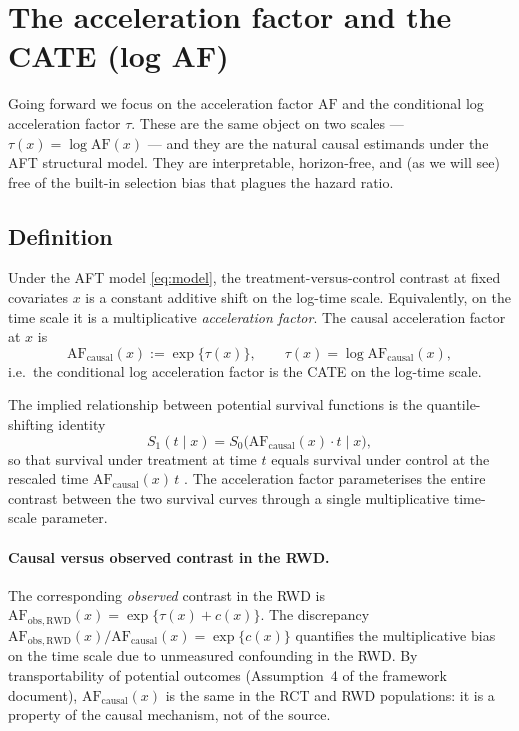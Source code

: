 \documentclass[11pt]{article}
\theoremstyle{plain}
\theoremstyle{definition}
\theoremstyle{remark}
\newcommand{\1}{\mathds{1}}
\newcommand{\tauf}{\tau}
\newcommand{\cf}{c}
\newcommand{\Spot}{S}
\newcommand{\AF}{\mathrm{AF}}
\begin{document}
\section{The acceleration factor and the CATE (log AF)}
\label{sec:AF}

Going forward we focus on the acceleration factor $\AF$ and the
conditional log acceleration factor $\tauf$. These are the same object on
two scales --- $\tauf(x) = \log \AF(x)$ --- and they are the natural
causal estimands under the AFT structural model. They are interpretable,
horizon-free, and (as we will see) free of the built-in selection bias
that plagues the hazard ratio.

\subsection{Definition}

Under the AFT model \eqref{eq:model}, the treatment-versus-control contrast
at fixed covariates $x$ is a constant additive shift on the log-time scale.
Equivalently, on the time scale it is a multiplicative \emph{acceleration
factor}. The causal acceleration factor at $x$ is
\begin{equation}
  \AF_{\mathrm{causal}}(x) := \exp\bigl\{\tauf(x)\bigr\}, \qquad
  \tauf(x) = \log \AF_{\mathrm{causal}}(x),
  \label{eq:AF-causal}
\end{equation}
i.e.\ the conditional log acceleration factor is the CATE on the log-time
scale.

The implied relationship between potential survival functions is the
quantile-shifting identity
\begin{equation}
  \Spot_{1}(t \mid x) = \Spot_{0}\bigl(\AF_{\mathrm{causal}}(x)\cdot t \mid x\bigr),
  \label{eq:AF-shift}
\end{equation}
so that survival under treatment at time $t$ equals survival under control
at the rescaled time $\AF_{\mathrm{causal}}(x)\,t$ \citep{CoxOakes1984,
Wei1992, KalbfleischPrentice2002}. The acceleration factor parameterises the entire
contrast between the two survival curves through a single multiplicative
time-scale parameter.

\paragraph{Causal versus observed contrast in the RWD.}
The corresponding \emph{observed} contrast in the RWD is
$\AF_{\mathrm{obs, RWD}}(x) = \exp\{\tauf(x) + \cf(x)\}$. The discrepancy
$\AF_{\mathrm{obs, RWD}}(x) / \AF_{\mathrm{causal}}(x) = \exp\{\cf(x)\}$
quantifies the multiplicative bias on the time scale due to unmeasured
confounding in the RWD. By transportability of potential outcomes
(Assumption~4 of the framework document), $\AF_{\mathrm{causal}}(x)$ is the
same in the RCT and RWD populations: it is a property of the causal
mechanism, not of the source.
\end{document}
